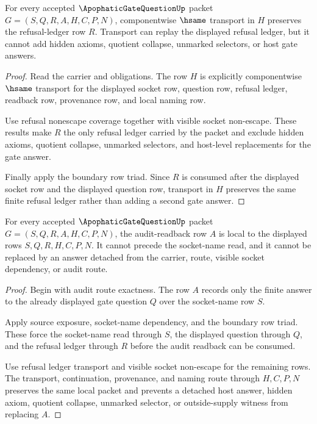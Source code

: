 \begin{theorem}
\label{thm:apophatic-gate-question-refusal-ledger-transport}
For every accepted $\ApophaticGateQuestionUp$ packet $G=(S,Q,R,A,H,C,P,N)$, componentwise $\hsame$ transport in $H$ preserves the refusal-ledger row $R$. Transport can replay the displayed refusal ledger, but it cannot add hidden axioms, quotient collapse, unmarked selectors, or host gate answers.
\end{theorem}
\begin{proof}
Read the carrier and \NameCert{} obligations. The row $H$ is explicitly componentwise $\hsame$ transport for the displayed socket row, question row, refusal ledger, readback row, provenance row, and local naming row.

Use refusal nonescape coverage together with visible socket non-escape. These results make $R$ the only refusal ledger carried by the packet and exclude hidden axioms, quotient collapse, unmarked selectors, and host-level replacements for the gate answer.

Finally apply the boundary row triad. Since $R$ is consumed after the displayed socket row and the displayed question row, transport in $H$ preserves the same finite refusal ledger rather than adding a second gate answer.
\end{proof}

\begin{theorem}
\label{thm:apophatic-gate-question-audit-readback-locality}
For every accepted $\ApophaticGateQuestionUp$ packet $G=(S,Q,R,A,H,C,P,N)$, the audit-readback row $A$ is local to the displayed rows $S,Q,R,H,C,P,N$. It cannot precede the socket-name read, and it cannot be replaced by an answer detached from the carrier, \NameCert{} route, visible socket dependency, or audit route.
\end{theorem}
\begin{proof}
Begin with audit route exactness. The row $A$ records only the finite answer to the already displayed gate question $Q$ over the socket-name row $S$.

Apply source exposure, socket-name dependency, and the boundary row triad. These force the socket-name read through $S$, the displayed question through $Q$, and the refusal ledger through $R$ before the audit readback can be consumed.

Use refusal ledger transport and visible socket non-escape for the remaining rows. The transport, continuation, provenance, and naming route through $H,C,P,N$ preserves the same local packet and prevents a detached host answer, hidden axiom, quotient collapse, unmarked selector, or outside-supply witness from replacing $A$.
\end{proof}

